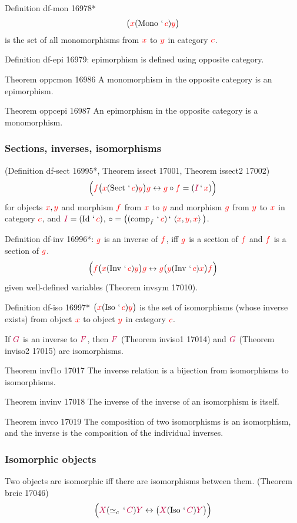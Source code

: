 \documentclass[12pt, letterpaper]{article}
\newcommand{\Id}{\operatorname{Id}}
\newcommand{\compf}{\operatorname{comp}_f}
\newcommand{\Mono}{\operatorname{Mono}}
\newcommand{\Sect}{\operatorname{Sect}}
\newcommand{\Inv}{\operatorname{Inv}}
\newcommand{\Iso}{\operatorname{Iso}}
\newcommand{\cic}{\simeq_c}
\newcommand{\red}[1]{{\color{red} #1}}
\newcommand{\purple}[1]{{\color{purple} #1}}
\newcommand{\lra}{\leftrightarrow}
\newcommand{\setvar}{\red}
\newcommand{\classvar}{\purple}
\newcommand{\scc}{\setvar{c}}
\newcommand{\sff}{\setvar{f}}
\newcommand{\sg}{\setvar{g}}
\newcommand{\sx}{\setvar{x}}
\newcommand{\sy}{\setvar{y}}
\newcommand{\clC}{\classvar{C}}
\newcommand{\clF}{\classvar{F}}
\newcommand{\clG}{\classvar{G}}
\newcommand{\clI}{\classvar{I}}
\newcommand{\clX}{\classvar{X}}
\newcommand{\clY}{\classvar{Y}}
\newcommand{\at}{\,`\,}
\newcommand{\otri}[3]{\left\langle{{#1},{#2},{#3}}\right\rangle}
\theoremstyle{definition}
\theoremstyle{remark}
\theoremstyle{definition}
\theoremstyle{plain}
\begin{document}
	Definition	df-mon 16978*
	\[\big(\sx(\Mono\at\scc)\sy\big)\]  is the set of all monomorphisms from $\sx$ to $\sy$ in category $\scc$.
	
	Definition	df-epi 16979: epimorphism is defined using opposite category.
	
	Theorem	oppcmon 16986	A monomorphism in the opposite category is an epimorphism.
	
	Theorem	oppcepi 16987	An epimorphism in the opposite category is a monomorphism.
	
	\subsubsection{Sections, inverses, isomorphisms}
	
	(Definition	df-sect 16995*,
	Theorem	issect 17001,
	Theorem	issect2 17002)
	\[\Big(\sff\big(\sx(\Sect\at\scc)\sy\big)\sg
	\lra
	\sg\circ\sff=(\clI\at\sx)\Big)\]
	for objects $\sx,\sy$ and morphism $\sff$ from $\sx$ to $\sy$ and morphism $\sg$ from $\sy$ to $\sx$ in category $\scc$, and $\clI=(\Id\at\scc)$, $\circ=\big((\compf\at\scc)\at\otri{\sx}{\sy}{\sx}\big)$.
	
	Definition	df-inv 16996*:
	$\sg$ is an inverse of $\sff$, iff $\sg$ is a section of $\sff$ and $\sff$ is a section of $\sg$.
	\[\Big(\sff\big(\sx(\Inv\at\scc)\sy\big)\sg\lra\sg\big(\sy(\Inv\at\scc)\sx\big)\sff\Big)\]
	given well-defined variables (Theorem	invsym 17010).
	
	Definition	df-iso 16997*
	$\big(\sx(\Iso\at\scc)\sy\big)$ is the set of isomorphisms (whose inverse exists) from object $\sx$ to object $\sy$ in category $\scc$.
	
	If $\clG$ is an inverse to $\clF$, then $\clF$ (Theorem	inviso1 17014) and $\clG$ (Theorem	inviso2 17015) are isomorphisms.
	
	Theorem	invf1o 17017	The inverse relation is a bijection from isomorphisms to isomorphisms.
	
	Theorem	invinv 17018	The inverse of the inverse of an isomorphism is itself.
	
	Theorem	invco 17019	The composition of two isomorphisms is an isomorphism, and the inverse is the composition of the individual inverses.
	
	\subsubsection{Isomorphic objects}
	
	Two objects are isomorphic iff there are isomorphisms between them. (Theorem	brcic 17046)
	\[
	\Big(\clX(\cic\at\clC)\clY\lra\big(\clX(\Iso\at\clC)\clY\big)\Big)
	\]
	
\end{document}
